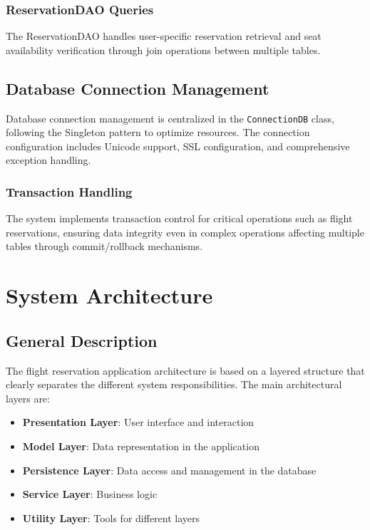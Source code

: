 \documentclass[conference]{IEEEtran}
\begin{document}
    \subsubsection{ReservationDAO Queries}
    The ReservationDAO handles user-specific reservation retrieval and seat availability verification through join operations between multiple tables.

    \subsection{Database Connection Management}
    Database connection management is centralized in the \texttt{ConnectionDB} class, following the Singleton pattern to optimize resources. The connection configuration includes Unicode support, SSL configuration, and comprehensive exception handling.

    \subsubsection{Transaction Handling}
    The system implements transaction control for critical operations such as flight reservations, ensuring data integrity even in complex operations affecting multiple tables through commit/rollback mechanisms.

    \section{System Architecture}

    \subsection{General Description}
    The flight reservation application architecture is based on a layered structure that clearly separates the different system responsibilities. The main architectural layers are:

    \begin{itemize}
        \item \textbf{Presentation Layer}: User interface and interaction
        \item \textbf{Model Layer}: Data representation in the application
        \item \textbf{Persistence Layer}: Data access and management in the database
        \item \textbf{Service Layer}: Business logic
        \item \textbf{Utility Layer}: Tools for different layers
    \end{itemize}
\end{document}
